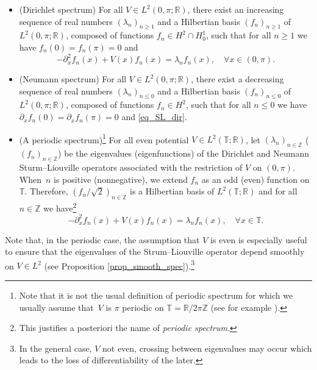 \skpt
\begin{proposition}[{\cite[Th.\,7, p.\,43]{PT}}]\label{prop_def_SL}
\begin{itemize}
\item
(Dirichlet spectrum) For all $V\in L^2(0,\pi;\mathbb{R})$, there exist an increasing sequence of real numbers $(\lambda_n)_{n\geq 1}$ and a Hilbertian basis $(f_n)_{n\geq 1}$ of $L^2(0,\pi;\mathbb{R})$, composed of functions $f_n \in H^2 \cap H^1_0$, such that for all $n\geq 1$ we have $f_n(0) = f_n(\pi) = 0$ and
\begin{equation}
\label{eq_SL_dir}
-\partial_x^2 f_n(x) + V(x) f_n(x) = \lambda_n f_n(x), \quad \forall x\in (0,\pi).
\end{equation}

\item
(Neumann spectrum) For all $V\in L^2(0,\pi;\mathbb{R})$, there exist a decreasing sequence of real numbers $(\lambda_n)_{n \leq 0}$ and a Hilbertian basis $(f_n)_{n\leq 0}$ of $L^2(0,\pi;\mathbb{R})$, composed of functions $f_n \in H^2$, such that for all $n\leq 0$ we have $\partial_x f_n(0) = \partial_x f_n(\pi) = 0$ and \eqref{eq_SL_dir}.

\item
(A periodic spectrum)\footnote{Note that it is not the usual definition of periodic spectrum for which we usually assume that~$V$ is $\pi$ periodic on $\mathbb{T}=\mathbb{R}/2\pi \mathbb{Z}$ (see for example \cite[App.\,B]{KP}).} For all even potential $V\in L^2(\mathbb{T};\mathbb{R})$, let $(\lambda_n)_{n\in \mathbb{Z}}$ (\resp $(f_n)_{n\in \mathbb{Z}}$) be the eigenvalues (\resp eigenfunctions) of the Dirichlet and Neumann Sturm--Liouville operators associated with the restriction of $V$ on $(0,\pi)$. When~$n$ is positive (\resp nonnegative), we extend $f_n$ as an odd (\resp even) function on $\mathbb{T}$. Therefore, $(f_n/\sqrt2)_{n\in \mathbb{Z}}$ is a Hilbertian basis of $L^2(\mathbb{T};\mathbb{R})$ and for all $n\in \mathbb{Z}$ we have\footnote{This justifies a posteriori the name of \emph{periodic spectrum}.}%
\begin{equation}
\label{eq_SL_per}
-\partial_x^2 f_n(x) + V(x) f_n(x) = \lambda_n f_n(x), \quad \forall x\in \mathbb{T}.
\end{equation}
\end{itemize}
\end{proposition}
Note that, in the periodic case, the assumption that $V$ is even is especially useful to ensure that the eigenvalues of the Strum--Liouville operator depend smoothly on $V\in L^2$ (see Proposition \ref{prop_smooth_spec}).\footnote{In the general case, \ie $V$ not even, crossing between eigenvalues may occur which leads to the loss of differentiability of the later.}

